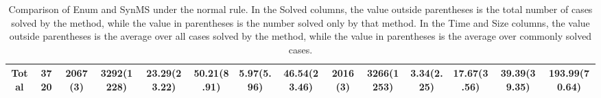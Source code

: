 \begin{table}[t]
{\begin{tabular}{|c|c|c|c|c|c|c|c|c|c|c|c|c|c|}
    \hline
    Total & 3720 & 2067(3) & \textbf{3292}(1228) & 23.29(23.22) & 50.21(\textbf{8.91}) & 5.97(\textbf{5.96}) & 46.54(23.46) & 2016(3) & \textbf{3266}(1253) & 3.34(\textbf{2.25}) & 17.67(3.56) & 39.39(\textbf{39.35}) & 193.99(70.64) \\
    \hline
  \end{tabular}%
  }
  \caption{Comparison of Enum and SynMS under the normal rule. In the Solved columns, the value outside parentheses is the total number of cases solved by the method, while the value in parentheses is the number solved only by that method. In the Time and Size columns, the value outside parentheses is the average over all cases solved by the method, while the value in parentheses is the average over commonly solved cases.}
  \label{tab:mixed-normal-enum-synms}
\end{table}

